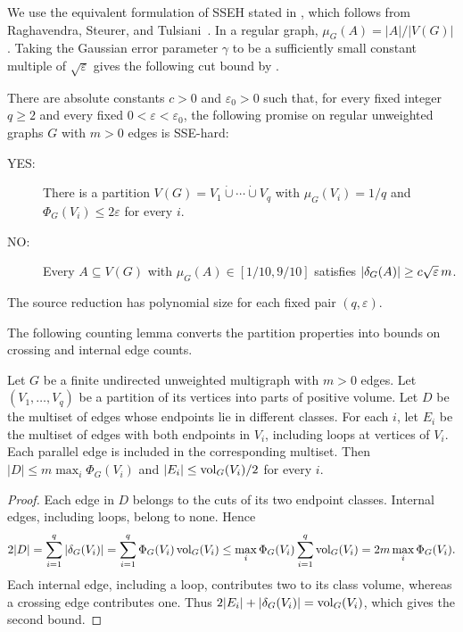 We use the equivalent formulation of \textup{SSEH} stated in
\cite[Conjecture~2.23 and Remark~2.25]{APW}, which follows from
Raghavendra, Steurer, and Tulsiani~\cite[Theorem~3.5]{RST}.
In a regular graph, $\mu_G(A)=|A|/|V(G)|$. Taking the Gaussian error
parameter $\gamma$ to be a sufficiently small constant multiple of
$\sqrt\varepsilon$ gives the following cut bound by
\cite[Fact~2.22 and Remark~2.25]{APW}.

\begin{theorem}\label{thm:sse-source}
There are absolute constants $c>0$ and $\varepsilon_0>0$ such that,
for every fixed integer $q\geq2$ and every fixed
$0<\varepsilon<\varepsilon_0$, the following promise on regular
unweighted graphs $G$ with $m>0$ edges is \textup{SSE}-hard:
\begin{description}
\item[YES:] There is a partition
  $V(G)=V_1\mathbin{\dot\cup}\cdots\mathbin{\dot\cup}V_q$ with
  $\mu_G(V_i)=1/q$ and $\Phi_G(V_i)\leq2\varepsilon$ for every $i$.
\item[NO:] Every $A\subseteq V(G)$ with
  $\mu_G(A)\in[1/10,9/10]$ satisfies
  $|\delta_G(A)|\geq c\sqrt{\varepsilon}\,m$.
\end{description}
The source reduction has polynomial size for each fixed pair
$(q,\varepsilon)$.
\end{theorem}

The following counting lemma converts the partition properties into
bounds on crossing and internal edge counts.

\begin{lemma}
\label{lem:sse-yes-edge-counts}
Let $G$ be a finite undirected unweighted multigraph with $m>0$ edges.
Let $(V_1,\ldots,V_q)$ be a partition of its vertices into parts
of positive volume.
Let $D$ be the multiset of edges whose endpoints lie in different
classes. For each $i$, let $E_i$ be the multiset of edges with both
endpoints in $V_i$, including loops at vertices of $V_i$. Each
parallel edge is included in the corresponding multiset. Then
$|D|\leq m\max_i\Phi_G(V_i)$ and
$|E_i|\leq\operatorname{vol}_G(V_i)/2$ for every $i$.
\end{lemma}

\begin{proof}
Each edge in $D$ belongs to the cuts of its two endpoint classes.
Internal edges, including loops, belong to none. Hence
\[
  2|D|=\sum_{i=1}^q |\delta_G(V_i)|
  =\sum_{i=1}^q\Phi_G(V_i)\operatorname{vol}_G(V_i)
  \leq\max_i\Phi_G(V_i)\sum_{i=1}^q\operatorname{vol}_G(V_i)
  =2m\max_i\Phi_G(V_i).
\]
Each internal edge, including a loop, contributes two to its class
volume, whereas a crossing edge contributes one. Thus
$2|E_i|+|\delta_G(V_i)|=\operatorname{vol}_G(V_i)$, which gives the second bound.
\end{proof}

